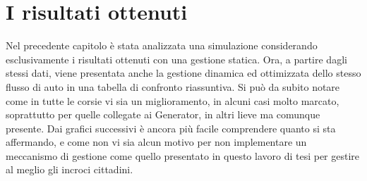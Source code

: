 \section{I risultati ottenuti}
Nel precedente capitolo è stata analizzata una simulazione considerando esclusivamente i risultati ottenuti con una gestione statica. Ora, a partire dagli stessi dati, viene presentata anche la gestione dinamica ed ottimizzata dello stesso flusso di auto in una tabella di confronto riassuntiva. Si può da subito notare come in tutte le corsie vi sia un miglioramento, in alcuni casi molto marcato, soprattutto per quelle collegate ai Generator, in altri lieve ma comunque presente. Dai grafici successivi è ancora più facile comprendere quanto si sta affermando, e come non vi sia alcun motivo per non implementare un meccanismo di gestione come quello presentato in questo lavoro di tesi per gestire al meglio gli incroci cittadini.

